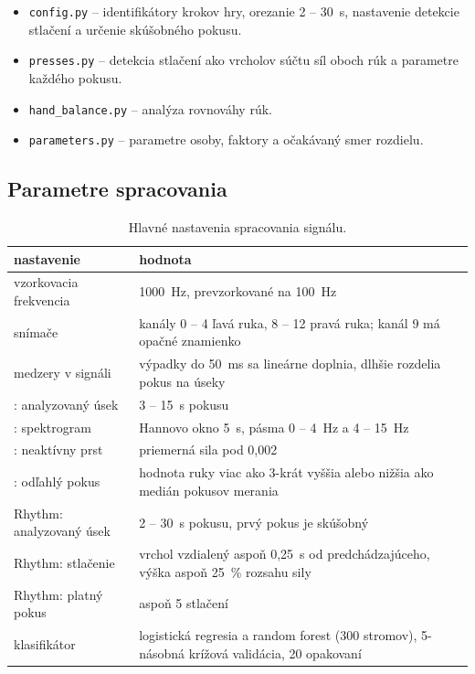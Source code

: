 \documentclass[12pt,a4paper]{article}
\begin{document}
\begin{itemize}
  \item \texttt{config.py} -- identifikátory krokov hry, orezanie 2 -- 30~s, nastavenie detekcie stlačení
        a určenie skúšobného pokusu.
  \item \texttt{presses.py} -- detekcia stlačení ako vrcholov súčtu síl oboch rúk a parametre každého pokusu.
  \item \texttt{hand\_balance.py} -- analýza rovnováhy rúk.
  \item \texttt{parameters.py} -- parametre osoby, faktory a očakávaný smer rozdielu.
\end{itemize}

\subsection{Parametre spracovania}

\begin{table}[H]
\centering\small
\caption{Hlavné nastavenia spracovania signálu.}
\begin{tabularx}{\textwidth}{@{}>{\raggedright\arraybackslash}p{5.8cm} L@{}}
\toprule
nastavenie & hodnota \\
\midrule
vzorkovacia frekvencia & 1000~Hz, prevzorkované na 100~Hz \\
snímače & kanály 0 -- 4 ľavá ruka, 8 -- 12 pravá ruka; kanál 9 má opačné znamienko \\
medzery v signáli & výpadky do 50~ms sa lineárne doplnia, dlhšie rozdelia pokus na úseky \\
\ef{}: analyzovaný úsek & 3 -- 15~s pokusu \\
\ef{}: spektrogram & Hannovo okno 5~s, pásma 0 -- 4~Hz a 4 -- 15~Hz \\
\ef{}: neaktívny prst & priemerná sila pod 0,002 \\
\ef{}: odľahlý pokus & hodnota ruky viac ako 3-krát vyššia alebo nižšia ako medián pokusov merania \\
Rhythm: analyzovaný úsek & 2 -- 30~s pokusu, prvý pokus je skúšobný \\
Rhythm: stlačenie & vrchol vzdialený aspoň 0,25~s od predchádzajúceho, výška aspoň 25~\% rozsahu sily \\
Rhythm: platný pokus & aspoň 5 stlačení \\
klasifikátor & logistická regresia a random forest (300 stromov), 5-násobná krížová validácia, 20 opakovaní \\
\bottomrule
\end{tabularx}
\end{table}
\end{document}
